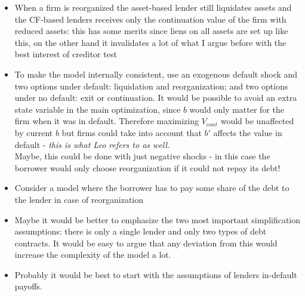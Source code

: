 \documentclass[12pt]{article}
\begin{document}
\begin{itemize}\setlength\itemsep{0em} \small
    \item When a firm is reorganized the asset-based lender still liquidates assets and the CF-based lenders receives only the continuation value of the firm with reduced assets: this has some merits since liens on all assets are set up like this, on the other hand it invalidates a lot of what I argue before with the best interest of creditor test
    \item To make the model internally consistent, use an exogenous default shock and two options under default: liquidation and reorganization; and two options under no default: exit or continuation. It would be possible to avoid an extra state variable in the main optimization, since $b$ would only matter for the firm when it was in default. Therefore maximizing $V_{cont}$ would be unaffected by current $b$ but firms could take into account that $b'$ affects the value in default - \textit{this is what Leo refers to as well.} \vspace{3mm} \\
    Maybe, this could be done with just negative shocks - in this case the borrower would only choose reorganization if it could not repay its debt!
    \item Consider a model where the borrower has to pay some share of the debt to the lender in case of reorganization
    \item Maybe it would be better to emphasize the two most important simplification assumptions: there is only a single lender and only two types of debt contracts. It would be easy to argue that any deviation from this would increase the complexity of the model a lot. 
    \item Probably it would be best to start with the assumptions of lenders in-default payoffs. 
\end{itemize} \normalsize
\end{document}
